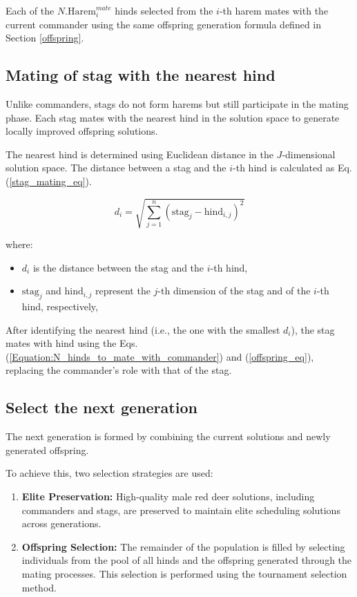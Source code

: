 \documentclass[pdflatex,sn-mathphys-num]{sn-jnl}%
\begin{document}
Each of the $N.{\text{Harem}_i^{mate}}$ hinds selected from the $i$-th harem mates with the current commander using the same offspring generation formula defined in Section \ref{offspring}. 

\subsection{Mating of stag with the nearest hind}\label{subsec4.8}
Unlike commanders, stags do not form harems but still participate in the mating phase. Each stag mates with the nearest hind in the solution space to generate locally improved offspring solutions.

The nearest hind is determined using Euclidean distance in the $J$-dimensional solution space. The distance between a stag and the $i$-th hind is calculated as Eq. (\ref{stag_mating_eq}).

\begin{equation}\label{stag_mating_eq}
d_i = \sqrt{ \sum_{j=1}^{n} (\text{stag}_j - \text{hind}_{i,j})^2 }
\end{equation}

\noindent where:
\begin{itemize}
    \item $d_i$ is the distance between the stag and the $i$-th hind,
    \item $\text{stag}_j$ and $\text{hind}_{i,j}$ represent the $j$-th dimension of the stag and of the $i$-th hind, respectively,
\end{itemize}

After identifying the nearest hind (i.e., the one with the smallest $d_i$), the stag mates with hind using the Eqs. (\ref{Equation:N_hinds_to_mate_with_commander}) and (\ref{offspring_eq}), replacing the commander’s role with that of the stag.


\subsection{Select the next generation}\label{subsec4.9}
The next generation is formed by combining the current solutions and newly generated offspring. 

To achieve this, two selection strategies are used:

\begin{enumerate}
    \item \textbf{Elite Preservation:} High-quality male red deer solutions, including commanders and stags, are preserved to maintain elite scheduling solutions across generations.
    
    \item \textbf{Offspring Selection:} The remainder of the population is filled by selecting individuals from the pool of all hinds and the offspring generated through the mating processes. This selection is performed using the tournament selection method.
\end{enumerate}
\end{document}
